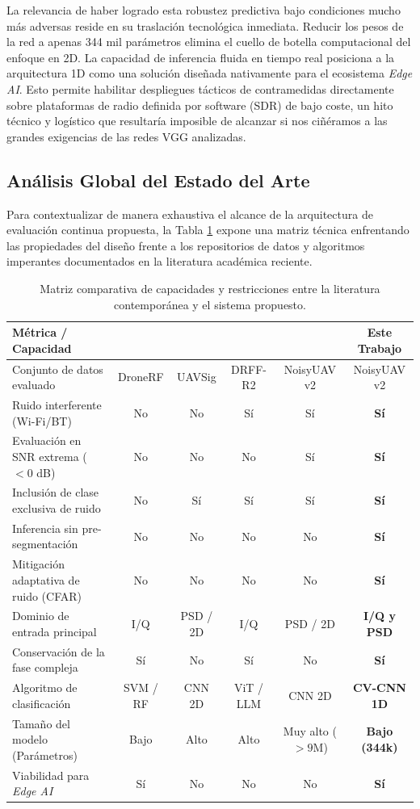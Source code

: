 La relevancia de haber logrado esta robustez predictiva bajo condiciones mucho más adversas reside en su traslación tecnológica inmediata. Reducir los pesos de la red a apenas 344 mil parámetros elimina el cuello de botella computacional del enfoque en 2D. La capacidad de inferencia fluida en tiempo real posiciona a la arquitectura 1D como una solución diseñada nativamente para el ecosistema \textit{Edge AI}. Esto permite habilitar despliegues tácticos de contramedidas directamente sobre plataformas de radio definida por software (SDR) de bajo coste, un hito técnico y logístico que resultaría imposible de alcanzar si nos ciñéramos a las grandes exigencias de las redes VGG analizadas.

\subsection{Análisis Global del Estado del Arte}
\label{subsec:disc_sota}

Para contextualizar de manera exhaustiva el alcance de la arquitectura de evaluación continua propuesta, la Tabla \ref{tab:sota_comparative} expone una matriz técnica enfrentando las propiedades del diseño frente a los repositorios de datos y algoritmos imperantes documentados en la literatura académica reciente.

\begin{table}[H]
\centering
\begin{tabular}{l c c c c c}
\toprule
\textbf{Métrica / Capacidad} & \textbf{\cite{allahham_dronerf_2019}} & \textbf{\cite{zhao_drone_2024}} & \textbf{\cite{zheng_multi-scenario_2026}} & \textbf{\cite{gluge_robust_2024}} & \textbf{Este Trabajo} \\
\midrule
Conjunto de datos evaluado & DroneRF & UAVSig & DRFF-R2 & NoisyUAV v2 & NoisyUAV v2 \\
Ruido interferente (Wi-Fi/BT) & No & No & Sí & Sí & \textbf{Sí} \\
Evaluación en SNR extrema ($<0$ dB) & No & No & No & Sí & \textbf{Sí} \\
Inclusión de clase exclusiva de ruido & No & Sí & Sí & Sí & \textbf{Sí} \\
Inferencia sin pre-segmentación & No & No & No & No & \textbf{Sí} \\
Mitigación adaptativa de ruido (CFAR) & No & No & No & No & \textbf{Sí} \\
Dominio de entrada principal & I/Q & PSD / 2D & I/Q & PSD / 2D & \textbf{I/Q y PSD} \\
Conservación de la fase compleja & Sí & No & Sí & No & \textbf{Sí} \\
Algoritmo de clasificación & SVM / RF & CNN 2D & ViT / LLM & CNN 2D & \textbf{CV-CNN 1D} \\
Tamaño del modelo (Parámetros) & Bajo & Alto & Alto & Muy alto ($>9$M) & \textbf{Bajo (344k)} \\
Viabilidad para \textit{Edge AI} & Sí & No & No & No & \textbf{Sí} \\
\bottomrule
\end{tabular}
\caption{Matriz comparativa de capacidades y restricciones entre la literatura contemporánea y el sistema propuesto.}
\label{tab:sota_comparative}
\end{table}

